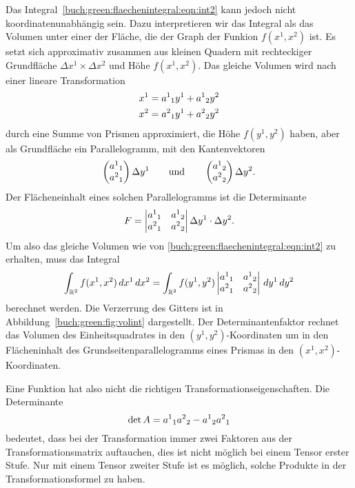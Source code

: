 Das Integral~\eqref{buch:green:flaechenintegral:eqn:int2} kann jedoch
nicht koordinatenunabhängig sein.
%
Dazu interpretieren wir das Integral als das Volumen unter einer der 
Fläche, die der Graph der Funkion $f(x^1,x^2)$ ist.
Es setzt sich approximativ zusammen aus kleinen Quadern mit
rechteckiger Grundfläche $\Delta x^1 \times \Delta x^2$ und Höhe
$f(x^1,x^2)$.
Das gleiche Volumen wird nach einer lineare Transformation 
\[
\begin{aligned}
x^1 &= a^1\mathstrut_1 y^1 + a^1\mathstrut_2 y^2 \\
x^2 &= a^2\mathstrut_1 y^1 + a^2\mathstrut_2 y^2 
\end{aligned}
\]
durch eine Summe von Prismen approximiert, die Höhe $f(y^1,y^2)$ haben,
aber als Grundfläche ein Parallelogramm, mit den Kantenvektoren
\[
\begin{pmatrix}
a^1\mathstrut_1\\
a^2\mathstrut_1
\end{pmatrix}
\Delta y^1
\qquad\text{und}\qquad
\begin{pmatrix}
a^1\mathstrut_2\\
a^2\mathstrut_2
\end{pmatrix}
\Delta y^2.
\]
Der Flächeneinhalt eines solchen Parallelogramms ist die Determinante
\[
F
=
\left|
\begin{matrix}
a^1\mathstrut_1 & a^1\mathstrut_2 \\
a^2\mathstrut_1 & a^2\mathstrut_2
\end{matrix}
\right|
\Delta y^1\cdot \Delta y^2.
\]
Um also das gleiche Volumen wie von
\eqref{buch:green:flaechenintegral:eqn:int2}
zu erhalten, muss das Integral
\[
\int_{\mathbb{R}^2}
f(x^1,x^2)
\,dx^1\,dx^2
=
\int_{\mathbb{R}^2}
f(y^1,y^2)
\left|
\begin{matrix}
a^1\mathstrut_1 & a^1\mathstrut_2 \\
a^2\mathstrut_1 & a^2\mathstrut_2
\end{matrix}
\right|
\,dy^1\,dy^2
\]
berechnet werden.
Die Verzerrung des Gitters ist in Abbildung~\ref{buch:green:fig:volint}
dargestellt.
Der Determinantenfaktor rechnet das Volumen des Einheitsquadrates in den
$(y^1,y^2)$-Koordinaten um in den Flächeninhalt des Grundseitenparallelogramms
eines Prismas in den $(x^1,x^2)$-Koordinaten.

Eine Funktion hat also nicht die richtigen Transformationseigenschaften.
Die Determinante
\[
\det A
=
a^1\mathstrut_1
a^2\mathstrut_2
-
a^1\mathstrut_2
a^2\mathstrut_1
\]
bedeutet, dass bei der Transformation immer zwei Faktoren aus der
Transformationsmatrix auftauchen, dies ist nicht möglich bei einem
Tensor erster Stufe.
Nur mit einem Tensor zweiter Stufe ist es möglich, solche Produkte 
in der Transformationsformel zu haben.

